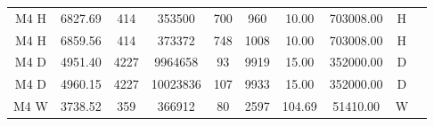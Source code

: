 \begin{table}[htb]
\begin{tabular}{c | c c c c c c c c c}
    \hline
    M4 H              & 6827.69        & 414              & 353500          & 700                & 960               & 10.00         & 703008.00     & H               \\
    M4 H              & 6859.56        & 414              & 373372          & 748                & 1008              & 10.00         & 703008.00     & H               \\
    \hline
    M4 D              & 4951.40        & 4227             & 9964658         & 93                 & 9919              & 15.00         & 352000.00     & D               \\
    M4 D              & 4960.15        & 4227             & 10023836        & 107                & 9933              & 15.00         & 352000.00     & D               \\
    \hline
    M4 W              & 3738.52        & 359              & 366912          & 80                 & 2597              & 104.69        & 51410.00      & W               \\

\end{tabular}
\end{table}
